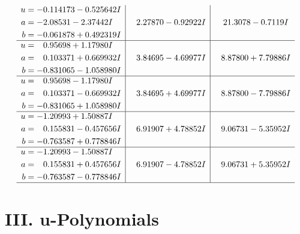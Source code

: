 \documentclass[1p]{elsarticle_modified}
\theoremstyle{definition}
\begin{document}
$$\begin{array}{c|c|c}
\begin{aligned}
u &= -0.114173 - 0.525642 I \\
a &= -2.08531 - 2.37442 I \\
b &= -0.061878 + 0.492319 I\end{aligned}
 & \phantom{-}2.27870 - 0.92922 I & \phantom{-}21.3078 - 0.7119 I \\ \hline\begin{aligned}
u &= \phantom{-}0.95698 + 1.17980 I \\
a &= \phantom{-}0.103371 + 0.669932 I \\
b &= -0.831065 - 1.058980 I\end{aligned}
 & \phantom{-}3.84695 - 4.69977 I & \phantom{-}8.87800 + 7.79886 I \\ \hline\begin{aligned}
u &= \phantom{-}0.95698 - 1.17980 I \\
a &= \phantom{-}0.103371 - 0.669932 I \\
b &= -0.831065 + 1.058980 I\end{aligned}
 & \phantom{-}3.84695 + 4.69977 I & \phantom{-}8.87800 - 7.79886 I \\ \hline\begin{aligned}
u &= -1.20993 + 1.50887 I \\
a &= \phantom{-}0.155831 - 0.457656 I \\
b &= -0.763587 + 0.778846 I\end{aligned}
 & \phantom{-}6.91907 + 4.78852 I & \phantom{-}9.06731 - 5.35952 I \\ \hline\begin{aligned}
u &= -1.20993 - 1.50887 I \\
a &= \phantom{-}0.155831 + 0.457656 I \\
b &= -0.763587 - 0.778846 I\end{aligned}
 & \phantom{-}6.91907 - 4.78852 I & \phantom{-}9.06731 + 5.35952 I\\
 \hline 
 \end{array}$$\newpage
\newpage\renewcommand{\arraystretch}{1}
\centering \section*{ III. u-Polynomials}
\end{document}
